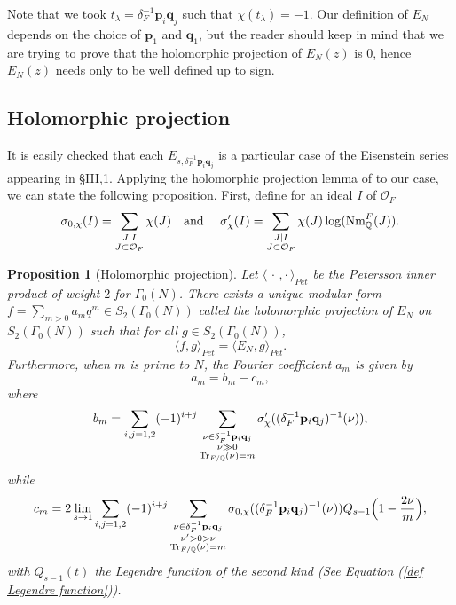\documentclass[a4paper,12pt]{article}
\newtheorem{proposition}[theorem]{Proposition}
\newcommand{\QQ}{\mathbb{Q}}
\begin{document}
     Note that we took $t_\lambda=\delta_F^{-1}\mathbf{p}_i\mathbf{q}_j$ such that $\chi(t_\lambda)=-1.$
    Our definition of $E_N$ depends on the choice of $\mathbf{p}_1$ and $\mathbf{q}_1$, but the reader should keep in mind that we are trying to prove that the holomorphic projection of $E_N(z)$ is $0$, hence $E_N(z)$ needs only to be well defined up to sign.
\subsection{Holomorphic projection}
It is easily checked that each $E_{s,\delta_F^{-1}\mathbf{p}_i\mathbf{q}_j}$ is a particular case of the Eisenstein series appearing in \cite{GrossKohnenZagier87} \S III,1. Applying the holomorphic projection lemma of \cite{GrossKohnenZagier87} to our case, we can state the following proposition. First, define for an ideal $I$ of $\mathcal{O}_F$
\begin{equation}
    \sigma_{0,\chi}(I)=\sum_{\substack{J\mid I\\ J\subset \mathcal{O}_F}}\chi(J)\quad\textup{and } \quad \sigma'_{\chi}(I)=\sum_{\substack{J\mid I\\ J\subset \mathcal{O}_F}}\chi(J)\log(\textup{Nm}^F_{\QQ}(J)).
\end{equation}
\begin{proposition}[Holomorphic projection]\label{thm mod}
Let $\langle\,\cdot \, , \cdot \, \rangle_{Pet}$ be the Petersson inner product of weight $2$ for $ \Gamma_0(N)$. There  exists a unique modular form $f=\sum_{m>0}a_mq^m\in S_2(\Gamma_0(N))$ called the holomorphic projection of $E_N$ on $S_2(\Gamma_0(N))$ such that for all $g\in S_2(\Gamma_0(N))$, 
 \[\langle f,g\rangle_{Pet}=\langle E_N,g\rangle_{Pet}.\]
 Furthermore, when $m$ is prime to $N$, the Fourier coefficient $a_m$ is given by
 \[
        a_m=b_m-c_m,
    \]
 where
    \begin{equation}
b_m=\sum_{i,j=1,2}(-1)^{i+j}\sum_{\substack{\nu\in \delta_F^{-1}\mathbf{p}_i\mathbf{q}_j\\ \nu\gg0\\ \textup{Tr}_{F/\mathbb{Q}}(\nu)=m}}\sigma'_{\chi}((\delta_F^{-1}\mathbf{p}_i\mathbf{q}_j)^{-1}(\nu)),
\end{equation}
while
\begin{equation}
c_m=2\lim_{s\rightarrow 1} \sum_{i,j=1,2}(-1)^{i+j}\sum_{\substack{\nu\in \delta_F^{-1}\mathbf{p}_i\mathbf{q}_j\\ \nu'>0>\nu\\ \textup{Tr}_{F/\mathbb{Q}}(\nu)=m}}\sigma_{0,\chi}((\delta_F^{-1}\mathbf{p}_i\mathbf{q}_j)^{-1}(\nu))Q_{s-1}\Bigl(1-\frac{2\nu}{m}\Bigl),
\end{equation}
with $Q_{s-1}(t)$ the Legendre function of the second kind (See Equation (\ref{def Legendre function})). 

\end{proposition}
\end{document}
